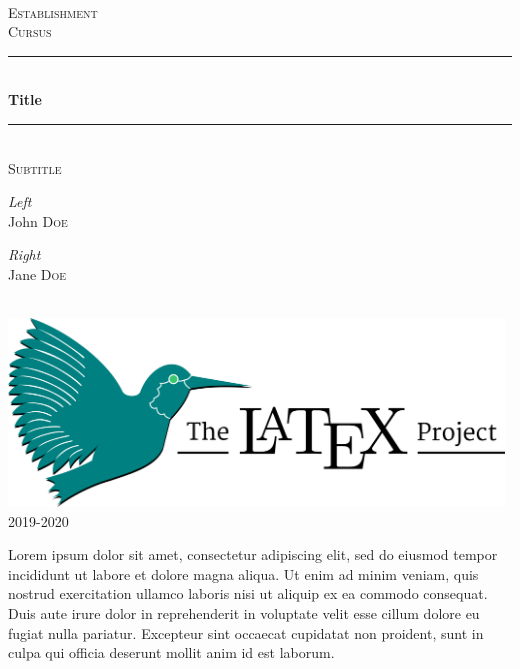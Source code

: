 \documentclass{report}
\begin{document}
\pagestyle{empty}
\begin{center}

    ~ \vfill

    \textsc{\LARGE Establishment}\\[1.5cm]
    \textsc{\Large Cursus}\\[0.5cm]

    \rule{\linewidth}{0.5mm} \\[0.4cm]
    {\huge \bfseries Title }\\[0.1cm]
    \rule{\linewidth}{0.5mm} \\[0.4cm]
    \textsc{\large Subtitle}\\[1.5cm]

    \begin{minipage}{0.4\textwidth}
        \begin{flushleft} \large
            \emph{Left}\\
            John \textsc{Doe}
        \end{flushleft}
        \end{minipage}\hspace{1cm}\begin{minipage}{0.4\textwidth}
        \begin{flushright} \large
            \emph{Right} \\
            Jane \textsc{Doe}
        \end{flushright}
    \end{minipage}\\[2cm]
    \vfill
    \includegraphics[height=5cm]{logo.png}\\[1cm]
    \vfill
    {\large 2019-2020}\\
\end{center}
\newpage

\dominitoc
\tableofcontents
\faketableofcontents

\begin{minipage}{\textwidth}
    Lorem ipsum dolor sit amet, consectetur adipiscing elit, sed do eiusmod tempor incididunt ut labore et dolore magna aliqua. Ut enim ad minim veniam, quis nostrud exercitation ullamco laboris nisi ut aliquip ex ea commodo consequat. Duis aute irure dolor in reprehenderit in voluptate velit esse cillum dolore eu fugiat nulla pariatur. Excepteur sint occaecat cupidatat non proident, sunt in culpa qui officia deserunt mollit anim id est laborum.
\end{minipage}

\newpage

\pagestyle{main}



\newpage
\pagestyle{empty}

\printindex
\end{document}
